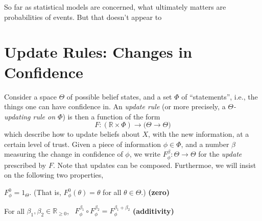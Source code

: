 \documentclass{article}
\begin{document}
    So far as statistical models are concerned, what ultimately matters are probabilities of events.
    But that doesn't appear to

\section{Update Rules: Changes in Confidence}
\def\X{\mathcal X}


Consider a space $\Theta$
of possible belief states,
and a set $\Phi$ of ``statements'', i.e., the things one can have confidence in.
An \emph{update rule}
(or more precisely, a \emph{$\Theta$-updating rule on $\Phi$})
is then a function of the form
\[
    F :  (\mathbb R \times \Phi) \to \Big( \Theta \to \Theta \Big)
\]
which describe how to update beliefs about $X$, with the new information, at a certain level of trust.
Given a piece of information $\phi \in \Phi$, and a number $\beta$ measuring the change in confidence of $\phi$, we write
$F^\beta_\phi : \Theta \to \Theta$
for the \emph{update} prescribed by $F$.
Note that updates can be composed.
Furthermoe, we will insist on the following two properties,
\begin{CFaxioms}
    \item  $F^{0}_\phi  = 1_{\Theta}$.
        (That is, $F^{0}_\phi(\theta) = \theta$ for all $\theta \in \Theta$.)
        \hfill \textbf{(zero)} \label{ax:zero}
    \item For all $\beta_1, \beta_2 \in \mathbb R_{\ge 0}$,~
        $F^{\beta_1}_\phi \circ F^{\beta_2}_\phi = F^{\beta_1 + \beta_2}_\phi$
        \hfill \textbf{(additivity)} \label{ax:additivity}
\end{CFaxioms}
\end{document}
